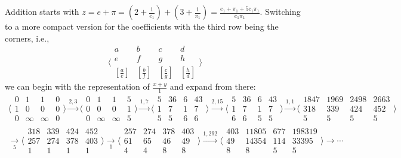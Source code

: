 \documentclass[12pt]{article}
\begin{document}
Addition starts with $z = e + \pi =  (2 + \frac{1}{e_1} ) + (3 + \frac{1}{\pi_1}) = \frac{e_1 + \pi_1 + 5 e_1 \pi_1}{e_1 \pi_1}$. Switching to a more compact version for the coefficients with the third row being the corners, i.e., 
$$\bigg\langle\begin{smallmatrix}
  a & b & c & d\\
  e & f & g & h \\
  [\frac{a}{e}] & [\frac{b}{f}] & [\frac{c}{g}] & [\frac{h}{d}] 
\end{smallmatrix}\bigg\rangle$$ we can begin with the representation of $\frac{x+y}{1}$ and expand from there: 
\begin{multline*}
\big\langle\begin{smallmatrix}
  0 & 1 & 1 & 0\\
  1 & 0 & 0 & 0\\
  0 & \infty & \infty & 0
\end{smallmatrix}\big\rangle
\xrightarrow{2, 3}
\big\langle\begin{smallmatrix}
  0 & 1 & 1 & 5\\
  0 & 0 & 0 & 1\\
  0 & \infty & \infty & 5 
\end{smallmatrix}\big\rangle
\xrightarrow{1, 7}
\big\langle\begin{smallmatrix}
  5 & 36 & 6 & 43\\
  1 & 7 & 1 & 7\\
  5 & 5 & 6 & 6 
\end{smallmatrix}\big\rangle
\xrightarrow{2, 15}
\big\langle\begin{smallmatrix}
  5 & 36 & 6 & 43\\
  1 & 7 & 1 & 7 \\
  6 & 6 & 5 & 5 
\end{smallmatrix}\big\rangle
\xrightarrow{1, 1}
\big\langle\begin{smallmatrix}
  1847 & 1969 & 2498 & 2663\\
  318 & 339 & 424 & 452 \\
  5 & 5 & 5 & 5 
\end{smallmatrix}\big\rangle
\\
\xrightarrow[5]{}
\big\langle\begin{smallmatrix}
  318 &339 & 424  & 452\\
  257 & 274 & 378 & 403 \\
  1 & 1 & 1 & 1
\end{smallmatrix}\big\rangle
\xrightarrow[1]{}
\big\langle\begin{smallmatrix}
  257 &274 & 378  & 403\\
  61 & 65 & 46 & 49 \\
  4 & 4 & 8 & 8
\end{smallmatrix}\big\rangle
\xrightarrow{1, 292}
\big\langle\begin{smallmatrix}
  403 & 11805 & 677 & 198319 \\
  49 & 14354 & 114 & 33395 \\
  8 & 8 & 5 & 5 
\end{smallmatrix}\big\rangle
\xrightarrow{}\cdots
\end{multline*}
\end{document}
